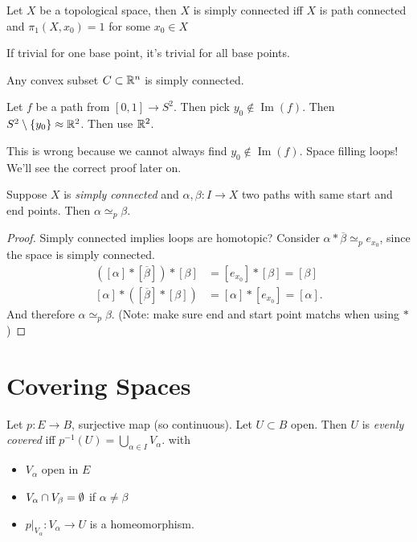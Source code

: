 \begin{definition}
    Let $X$ be a topological space, then $X$ is simply connected iff $X$ is path connected and $\pi_1(X, x_0) = 1$ for some $x_0 \in X$
\end{definition}

\begin{remark}
    If trivial for one base point, it's trivial for all base points.
\end{remark}

\begin{eg}
    Any convex subset $C \subset \mathbb{R}^n$ is simply connected.
\end{eg}
\begin{eg}
    Let $f$ be a path from  $[0, 1] \to  S^2$.
    Then pick $y_0 \not\in \operatorname{Im}(f)$. Then $S^2 \setminus \{ y_0\} \approx \mathbb{R}^2$.
    Then use $\mathbb{R}^2$.

    This is wrong because we cannot always find $y_0 \not\in  \operatorname{Im}(f)$. Space filling loops! We'll see the correct proof later on.
\end{eg}

\begin{lemma}
    Suppose $X$ is \emph{simply connected} and $\alpha, \beta: I \to  X$ two paths with same start and end points.
    Then $\alpha \simeq_p \beta$.
\end{lemma}
\begin{proof}
    Simply connected implies loops are homotopic?
    Consider $\alpha * \overline{\beta} \simeq_p  e_{x_0}$, since the space is simply connected.
    \begin{align*}
        ([\alpha] * [\overline{ \beta}]) * [\beta] &= [e_{x_0}] * [\beta] = [\beta]\\
        [\alpha] * ([\overline{ \beta}] * [\beta]) &= [\alpha] * [e_{x_0}] = [\alpha]
    .\end{align*}
    And therefore $\alpha \simeq_p  \beta$.
    (Note: make sure end and start point matchs when using $*$)
\end{proof}

\section{Covering Spaces}
\begin{definition}
    Let $p : E \to  B$, surjective map (so continuous).
    Let $U \subset B$ open.
    Then $U$ is \emph{evenly covered} iff $ p^{-1}(U) = \bigcup_{\alpha \in I} V_\alpha .$ 
    with
    \begin{itemize}
        \item $V_\alpha$ open in $E$ 
        \item $V_\alpha \cap V_\beta = \emptyset$ if $\alpha \neq \beta$
        \item  $p|_{V_\alpha} : V_\alpha \to  U$ is a homeomorphism.
    \end{itemize}
\end{definition}



